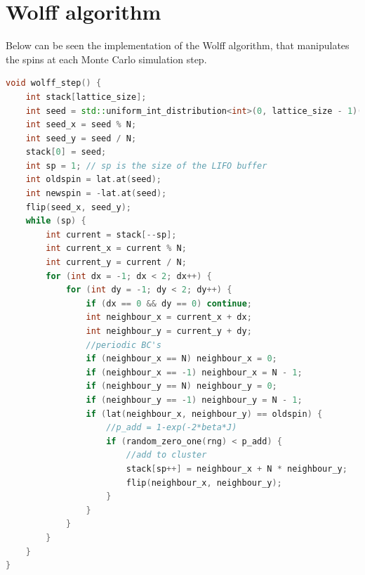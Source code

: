 \documentclass[a4paper]{article}
\begin{document}
\section{Wolff algorithm}\label{sec:wolf}
Below can be seen the implementation of the Wolff algorithm, that manipulates the spins at each Monte Carlo simulation step.
\begin{lstlisting}[language=C++]
void wolff_step() {
	int stack[lattice_size];
	int seed = std::uniform_int_distribution<int>(0, lattice_size - 1)(rng);
	int seed_x = seed % N;
	int seed_y = seed / N;
	stack[0] = seed;
	int sp = 1; // sp is the size of the LIFO buffer
	int oldspin = lat.at(seed);
	int newspin = -lat.at(seed);
	flip(seed_x, seed_y);
	while (sp) {
		int current = stack[--sp];
		int current_x = current % N;
		int current_y = current / N;
		for (int dx = -1; dx < 2; dx++) {
			for (int dy = -1; dy < 2; dy++) {
				if (dx == 0 && dy == 0) continue;
				int neighbour_x = current_x + dx;
				int neighbour_y = current_y + dy;
				//periodic BC's
				if (neighbour_x == N) neighbour_x = 0;
				if (neighbour_x == -1) neighbour_x = N - 1;
				if (neighbour_y == N) neighbour_y = 0;
				if (neighbour_y == -1) neighbour_y = N - 1;
				if (lat(neighbour_x, neighbour_y) == oldspin) {
					//p_add = 1-exp(-2*beta*J)
					if (random_zero_one(rng) < p_add) {
						//add to cluster
						stack[sp++] = neighbour_x + N * neighbour_y;
						flip(neighbour_x, neighbour_y);
					}
				}
			}
		}
	}
}
\end{lstlisting}
\end{document}
